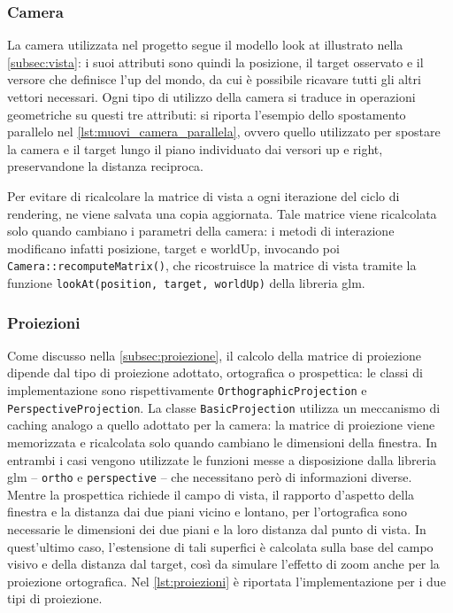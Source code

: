 \subsubsection{Camera}
La camera utilizzata nel progetto segue il modello look at illustrato nella \cref{subsec:vista}: i suoi attributi sono quindi la posizione, il target osservato e il versore che definisce l'up del mondo, da cui è possibile ricavare tutti gli altri vettori necessari.
Ogni tipo di utilizzo della camera si traduce in operazioni geometriche su questi tre attributi: si riporta l'esempio dello spostamento parallelo nel \cref{lst:muovi_camera_parallela}, ovvero quello utilizzato per spostare la camera e il target lungo il piano individuato dai versori up e right, preservandone la distanza reciproca.



Per evitare di ricalcolare la matrice di vista a ogni iterazione del ciclo di rendering, ne viene salvata una copia aggiornata.
Tale matrice viene ricalcolata solo quando cambiano i parametri della camera: i metodi di interazione modificano infatti posizione, target e worldUp, invocando poi \texttt{Camera::recomputeMatrix()}, che ricostruisce la matrice di vista tramite la funzione \texttt{lookAt(position, target, worldUp)} della libreria glm.

\subsubsection{Proiezioni}
Come discusso nella \cref{subsec:proiezione}, il calcolo della matrice di proiezione dipende dal tipo di proiezione adottato, ortografica o prospettica: le classi di implementazione sono rispettivamente \texttt{OrthographicProjec\allowbreak{}tion} e \texttt{PerspectiveProjection}.
La classe \texttt{BasicProjection} utilizza un meccanismo di caching analogo a quello adottato per la camera: la matrice di proiezione viene memorizzata e ricalcolata solo quando cambiano le dimensioni della finestra.
In entrambi i casi vengono utilizzate le funzioni messe a disposizione dalla libreria glm -- \texttt{ortho} e \texttt{perspective} -- che necessitano però di informazioni diverse.
Mentre la prospettica richiede il campo di vista, il rapporto d'aspetto della finestra e la distanza dai due piani vicino e lontano, per l'ortografica sono necessarie le dimensioni dei due piani e la loro distanza dal punto di vista.
In quest'ultimo caso, l'estensione di tali superfici è calcolata sulla base del campo visivo e della distanza dal target, così da simulare l'effetto di zoom anche per la proiezione ortografica.
Nel \cref{lst:proiezioni} è riportata l'implementazione per i due tipi di proiezione.

